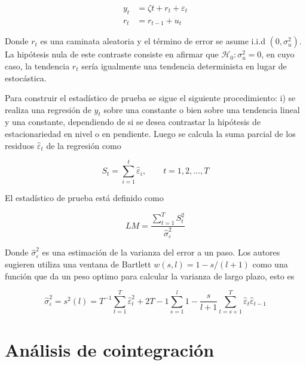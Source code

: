 \documentclass[12pt, twoside]{book}\usepackage[]{graphicx}\usepackage[]{color}
\numberwithin{equation}{section}
\numberwithin{theorem}{section}
\numberwithin{teorema}{section}
\numberwithin{defi}{section}
\numberwithin{prop}{section}
\numberwithin{defi}{section}
\theoremstyle{plain}
\begin{document}
\begin{align}
y_{t} & = \zeta t+r_{t}+\varepsilon_{t} \\  
r_{t} & = r_{t-1}+u_{t}
\end{align}

Donde $r_{t}$ es una caminata aleatoria y el término de error se asume i.i.d $(0,\sigma^{2}_{u})$. La hipótesis nula de este contraste consiste en afirmar que $\mathcal{H}_{0}: \sigma^{2}_{u}=0$, en cuyo caso, la tendencia $r_{t}$ sería igualmente una tendencia determinista en lugar de estocástica. 

Para construir el estadístico de prueba se sigue el siguiente procedimiento: i) se realiza una regresión de $y_{t}$ sobre una constante o bien sobre una tendencia lineal y una constante, dependiendo de si se desea contrastar la hipótesis de estacionariedad en nivel o en pendiente. Luego se calcula la suma parcial de los residuos $\hat{\varepsilon}_{t}$ de la regresión como 

\begin{equation}
S_{t} = \sum_{i=1}^{t}\hat{\varepsilon}_{i}, \qquad t=1,2,...,T
\end{equation}

El estadístico de prueba está definido como 

\begin{equation}
LM  = \frac{\sum_{t=1}^{T}S_{t}^{2}}{\hat{\sigma}^{2}_{\varepsilon}}
\end{equation}

Donde $\hat{\sigma}^{2}_{\varepsilon}$ es una estimación de la varianza del error a un paso. Los autores sugieren utiliza una ventana de Bartlett $w(s,l)=1-s/(l+1)$ como una función que da un peso optimo para calcular la varianza de largo plazo, esto es

\begin{equation}
\hat{\sigma}^{2}_{\varepsilon} = s^{2}(l)=T^{-1}\sum_{t=1}^{T}\hat{\varepsilon}^{2}_{t}+2T-1\sum_{s=1}^{l}1-\frac{s}{l+1}\sum_{t=s+1}^{T}\hat{\varepsilon}_{t}\hat{\varepsilon}_{t-1}
\end{equation}



\section{Análisis de cointegración}
\end{document}
